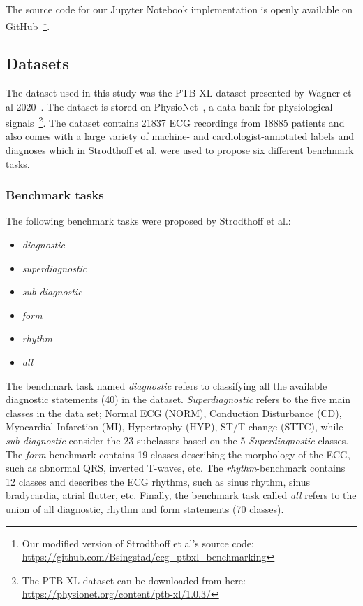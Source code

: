 The source code for our Jupyter Notebook implementation is openly available on GitHub~\footnote{Our modified version of Strodthoff et al's source code: \url{https://github.com/Bsingstad/ecg_ptbxl_benchmarking}}.



\subsection{Datasets}

The dataset used in this study was the PTB-XL dataset presented by Wagner et al 2020~\cite{wagner_et_al_ptb-xl_2020}. The dataset is stored on PhysioNet~\cite{wagner_ptb-xl_nodate,goldberger_physiobank_2000}, a data bank for physiological signals~\footnote{The PTB-XL dataset can be downloaded from here: \url{https://physionet.org/content/ptb-xl/1.0.3/}}. The dataset contains 21837 ECG recordings from 18885 patients and also comes with a large variety of machine- and cardiologist-annotated labels and diagnoses which in Strodthoff et al. were used to propose six different benchmark tasks. 

\subsubsection{Benchmark tasks}
The following benchmark tasks were proposed by Strodthoff et al.:

\begin{itemize}[noitemsep,topsep=1pt]
    \item \textit{diagnostic}
    \item \textit{superdiagnostic}
    \item \textit{sub-diagnostic}
    \item \textit{form}
    \item \textit{rhythm}
    \item \textit{all}
\end{itemize}

The benchmark task named \textit{diagnostic} refers to classifying all the available diagnostic statements (40) in the dataset. \textit{Superdiagnostic} refers to the five main classes in the data set; Normal ECG (NORM), Conduction Disturbance (CD), Myocardial Infarction (MI), Hypertrophy (HYP), ST/T change (STTC), while \textit{sub-diagnostic} consider the 23 subclasses based on the 5 \textit{Superdiagnostic} classes. The \textit{form}-benchmark contains 19 classes describing the morphology of the ECG, such as abnormal QRS, inverted T-waves, etc. The \textit{rhythm}-benchmark contains 12 classes and describes the ECG rhythms, such as sinus rhythm, sinus bradycardia, atrial flutter, etc. Finally, the benchmark task called \textit{all} refers to the union of all diagnostic, rhythm and form statements (70 classes).

